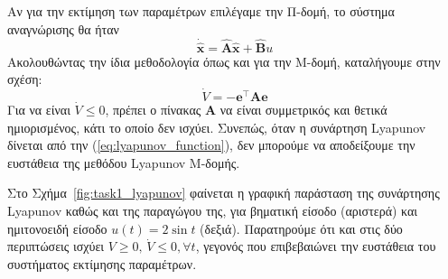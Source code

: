 \documentclass[a4paper,12pt]{article}
\begin{document}
Αν για την εκτίμηση των παραμέτρων επιλέγαμε την Π-δομή, το σύστημα αναγνώρισης θα ήταν
\[
    \dot{\hat{\mathbf{x}}} = \hat{\mathbf{A}}\hat{\mathbf{x}} + \hat{\mathbf{B}} u
\]
Ακολουθώντας την ίδια μεθοδολογία όπως και για την Μ-δομή, καταλήγουμε στην σχέση:
\[
\dot{V} = -\mathbf{e}^{\top}\mathbf{Α}\mathbf{e} 
\]
Για να είναι $\dot{V} \leq 0$, πρέπει ο πίνακας $\mathbf{A}$ να είναι συμμετρικός και θετικά ημιορισμένος,
κάτι το οποίο δεν ισχύει. Συνεπώς, όταν η συνάρτηση Lyapunov
δίνεται από την (\ref{eq:lyapunov_function}), δεν μπορούμε να αποδείξουμε την ευστάθεια της μεθόδου 
Lyapunov Μ-δομής.

Στο Σχήμα~\ref{fig:task1_lyapunov} φαίνεται η γραφική παράσταση της συνάρτησης 
Lyapunov καθώς και της παραγώγου της, για βηματική είσοδο 
(αριστερά) και ημιτονοειδή είσοδο $u(t) = 2 \sin t$ (δεξιά). Παρατηρούμε ότι και στις δύο περιπτώσεις 
ισχύει $V \geq 0, \, \dot{V} \leq 0, \forall t$, γεγονός που επιβεβαιώνει την ευστάθεια του συστήματος 
εκτίμησης παραμέτρων.
\end{document}
